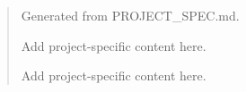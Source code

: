 \begin{abstract}
Generated from PROJECT_SPEC.md.

Add project-specific content here.

Add project-specific content here.
\end{abstract}
